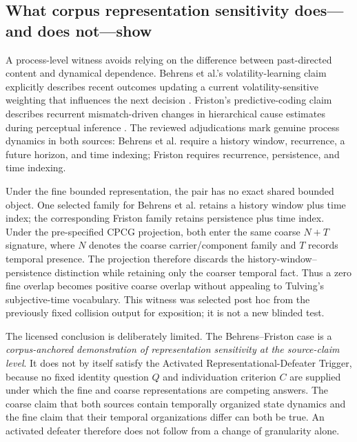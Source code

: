 \documentclass[11pt]{article}
\begin{document}
\subsection{What corpus representation sensitivity does---and does not---show}

A process-level witness avoids relying on the difference between past-directed content and dynamical dependence. Behrens et al.'s volatility-learning claim explicitly describes recent outcomes updating a current volatility-sensitive weighting that influences the next decision \citep{BehrensEtAl2007ValueInformation}. Friston's predictive-coding claim describes recurrent mismatch-driven changes in hierarchical cause estimates during perceptual inference \citep{Friston2005CorticalResponses}. The reviewed adjudications mark genuine process dynamics in both sources: Behrens et al. require a history window, recurrence, a future horizon, and time indexing; Friston requires recurrence, persistence, and time indexing.

Under the fine bounded representation, the pair has no exact shared bounded object. One selected family for Behrens et al. retains a history window plus time index; the corresponding Friston family retains persistence plus time index. Under the pre-specified CPCG projection, both enter the same coarse \(N+T\) signature, where \(N\) denotes the coarse carrier/component family and \(T\) records temporal presence. The projection therefore discards the history-window--persistence distinction while retaining only the coarser temporal fact. Thus a zero fine overlap becomes positive coarse overlap without appealing to Tulving's subjective-time vocabulary. This witness was selected post hoc from the previously fixed collision output for exposition; it is not a new blinded test.

The licensed conclusion is deliberately limited. The Behrens--Friston case is a \emph{corpus-anchored demonstration of representation sensitivity at the source-claim level}. It does not by itself satisfy the Activated Representational-Defeater Trigger, because no fixed identity question \(Q\) and individuation criterion \(C\) are supplied under which the fine and coarse representations are competing answers. The coarse claim that both sources contain temporally organized state dynamics and the fine claim that their temporal organizations differ can both be true. An activated defeater therefore does not follow from a change of granularity alone.
\end{document}
